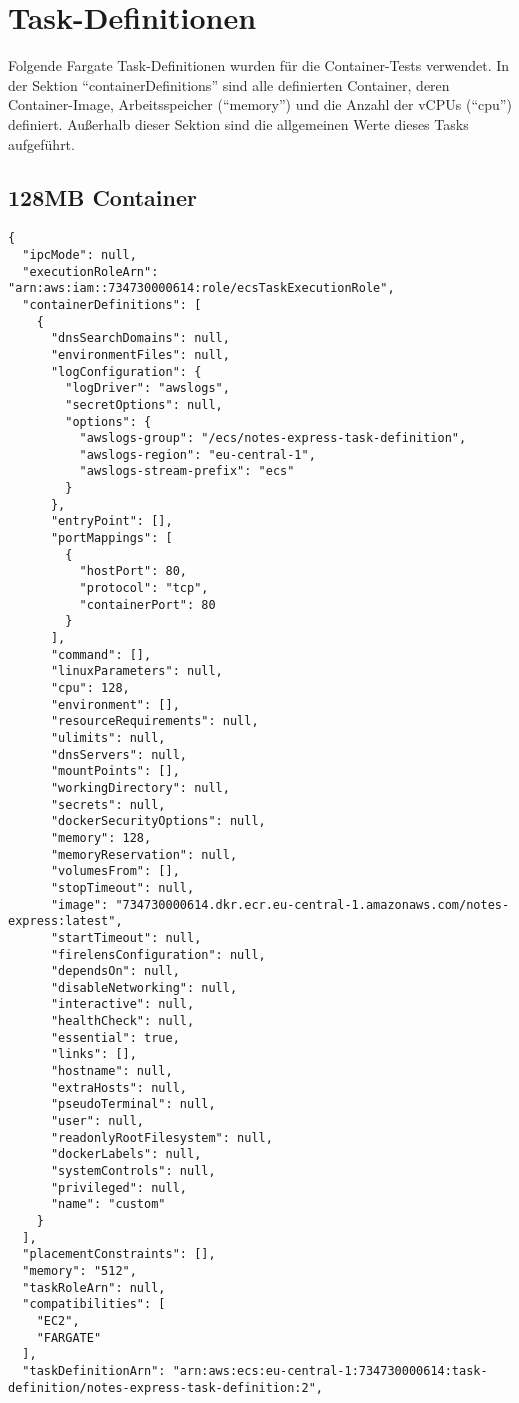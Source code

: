 \chapter{Task-Definitionen}
\label{apx:task-definitions}
Folgende Fargate Task-Definitionen wurden für die Container-Tests verwendet. In der Sektion "`containerDefinitions"' sind alle definierten Container, deren Container-Image, Arbeitsspeicher ("`memory"') und die Anzahl der vCPUs ("`cpu"') definiert. Außerhalb dieser Sektion sind die allgemeinen Werte dieses Tasks aufgeführt.

\section{128MB Container}
\begin{verbatim}
{
  "ipcMode": null,
  "executionRoleArn": "arn:aws:iam::734730000614:role/ecsTaskExecutionRole",
  "containerDefinitions": [
    {
      "dnsSearchDomains": null,
      "environmentFiles": null,
      "logConfiguration": {
        "logDriver": "awslogs",
        "secretOptions": null,
        "options": {
          "awslogs-group": "/ecs/notes-express-task-definition",
          "awslogs-region": "eu-central-1",
          "awslogs-stream-prefix": "ecs"
        }
      },
      "entryPoint": [],
      "portMappings": [
        {
          "hostPort": 80,
          "protocol": "tcp",
          "containerPort": 80
        }
      ],
      "command": [],
      "linuxParameters": null,
      "cpu": 128,
      "environment": [],
      "resourceRequirements": null,
      "ulimits": null,
      "dnsServers": null,
      "mountPoints": [],
      "workingDirectory": null,
      "secrets": null,
      "dockerSecurityOptions": null,
      "memory": 128,
      "memoryReservation": null,
      "volumesFrom": [],
      "stopTimeout": null,
      "image": "734730000614.dkr.ecr.eu-central-1.amazonaws.com/notes-express:latest",
      "startTimeout": null,
      "firelensConfiguration": null,
      "dependsOn": null,
      "disableNetworking": null,
      "interactive": null,
      "healthCheck": null,
      "essential": true,
      "links": [],
      "hostname": null,
      "extraHosts": null,
      "pseudoTerminal": null,
      "user": null,
      "readonlyRootFilesystem": null,
      "dockerLabels": null,
      "systemControls": null,
      "privileged": null,
      "name": "custom"
    }
  ],
  "placementConstraints": [],
  "memory": "512",
  "taskRoleArn": null,
  "compatibilities": [
    "EC2",
    "FARGATE"
  ],
  "taskDefinitionArn": "arn:aws:ecs:eu-central-1:734730000614:task-definition/notes-express-task-definition:2",

\end{verbatim}
